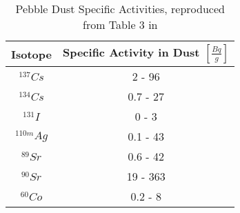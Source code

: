 \begin{table}[h!]
\centering
\begin{tabular}{ c   c }
\hline
Isotope & Specific Activity in Dust $[\frac{Bq}{g}]$  \\
\hline
$^{137}Cs$ & 2 - 96  \\
$^{134}Cs$ & 0.7 - 27 \\
$^{131}I$ & 0 - 3  \\
$^{110m}Ag$ & 0.1 - 43 \\
$^{89}Sr$ & 0.6 - 42 \\
$^{90}Sr$ & 19 - 363  \\
$^{60}Co$ & 0.2 - 8 \\
\hline
\end{tabular}
\caption{Pebble Dust Specific Activities, reproduced from Table 3 in \cite{noauthor_results_1990}}
\label{table:gas-acc}
\end{table}